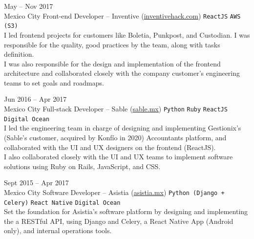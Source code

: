 \documentclass[9pt]{developercv} %
\begin{document}
\begin{entrylist}
    \entry
        {
            May -- Nov 2017
            \\\footnotesize{Mexico City}
        }
        {Front-end Developer – Inventive ({\href{https://www.linkedin.com/company/inventivehack/}{\underline{inventivehack.com}}})}
        { 
            \texttt{ReactJS}
            \slashsep\texttt{AWS (S3)}
        }
        {\\
            I led frontend projects for customers like Boletia, Punkpost, and Custodian. I was 
            responsible for the quality, good practices by the team, along with tasks definition.\\
            
            I was also responsible for the design and implementation of the frontend architecture
            and collaborated closely with the company customer's engineering teams to set goals and 
            roadmaps.\\
        }

    \entry
        {
            Jun 2016 -- Apr 2017
            \\\footnotesize{Mexico City}
        }
        {Full-stack Developer – Sable ({\href{https://sable.mx/}{\underline{sable.mx}}})}
        {
            \texttt{Python}
            \slashsep\texttt{Ruby}
            \slashsep\texttt{ReactJS}
            \slashsep\texttt{Digital Ocean}
        }
        {\\
            I led the engineering team in charge of designing and implementing Gestionix's 
            (Sable's customer, acquired by Konfío in 2020) Accountants platform, and collaborated with 
            the UI and UX designers on the frontend (ReactJS).\\

            I also collaborated closely with the UI and UX teams to implement software solutions 
            using Ruby on Rails, JavaScript, and CSS.\\
        }

    \entry
        {
            Sept 2015 -- Apr 2017
            \\\footnotesize{Mexico City}
        }
        {Software Developer – Asistia ({\href{https://www.linkedin.com/company/asistia/}{\underline{asistia.mx}}})}
        {
            \texttt{Python (Django + Celery)}
            \slashsep\texttt{React Native}
            \slashsep\texttt{Digital Ocean}
        }
        {\\
            Set the foundation for Asistia's software platform by designing and implementing the a 
            RESTful API, using Django and Celery, a React Native App (Android only), and internal 
            operations tools.\\

}
\end{entrylist}
\end{document}
